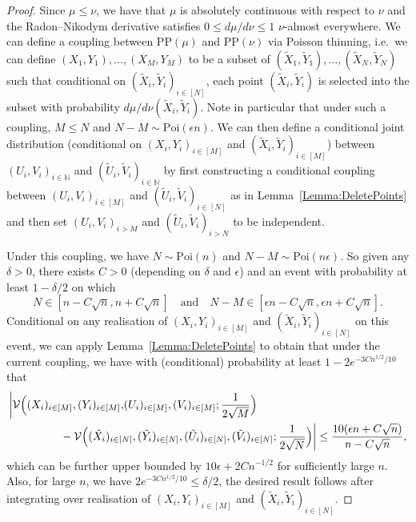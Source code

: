 \documentclass[11pt]{article}
\begin{document}
\begin{proof}
    Since $\mu\leq \nu$, we have that $\mu$ is absolutely continuous with respect to $\nu$ and the Radon--Nikodym derivative satisfies $0\leq d\mu/d\nu\leq 1$ $\nu$-almost everywhere. We can define a coupling between $\mathrm{PP}(\mu)$ and $\mathrm{PP}(\nu)$ via Poisson thinning, i.e.\ we can define $(X_1,Y_1),\ldots,(X_M,Y_M)$ to be a subset of $(\tilde X_1,\tilde Y_1),\ldots,(\tilde X_N,\tilde Y_N)$ such that conditional on $(\tilde X_i,\tilde Y_i)_{i\in[N]}$, each point $(\tilde X_i, \tilde Y_i)$ is selected into the subset with probability $d\mu/d\nu(\tilde X_i, \tilde Y_i)$. Note in particular that under such a coupling, $M\leq N$ and $N-M\sim \mathrm{Poi}(\epsilon n)$. 
    We can then define a conditional joint distribution (conditional on $(X_i,Y_i)_{i\in[M]}$ and $(\tilde X_i,\tilde Y_i)_{i\in[M]}$) between $(U_i,V_i)_{i\in\mathbb{N}}$ and $(\tilde U_i,\tilde V_i)_{i\in\mathbb{N}}$ by first constructing a conditional coupling between $(U_i, V_i)_{i\in [M]}$ and $(\tilde U_i,\tilde V_i)_{i\in [N]}$ as in Lemma~\ref{Lemma:DeletePoints} and then set $(U_i,V_i)_{i > M}$ and $(\tilde U_i, \tilde V_i)_{i > N}$ to be independent.

    Under this coupling, we have $N\sim \mathrm{Poi}(n)$ and $N-M\sim\mathrm{Poi}(n\epsilon)$. So given any $\delta > 0$, there exists $C > 0$ (depending on $\delta$ and $\epsilon$) and an event with probability at least $1-\delta/2$ on which 
    \[
    N \in [n-C\sqrt{n}, n+C\sqrt{n}] \quad \text{and}\quad  N-M \in [\epsilon n-C\sqrt{n}, \epsilon n + C\sqrt{n}].
    \]
    Conditional on any realisation of $(X_i,Y_i)_{i\in[M]}$ and $(\tilde X_i,\tilde Y_i)_{i\in [N]}$ on this event, we can apply Lemma~\ref{Lemma:DeletePoints} to obtain that under the current coupling, we have with (conditional) probability at least $1-2e^{-3Cn^{1/2}/10}$ that 
    \begin{align*}
    \biggl|\mathcal{V}\Bigl((X_i)_{i\in[M]}, (Y_i)_{i\in[M]}, &(U_i)_{i\in[M]}, (V_i)_{i\in[M]}; \frac{1}{2\sqrt{M}}\Bigr) \\
    & \hspace{-2cm}- \mathcal{V}\Bigl((\tilde X_i)_{i\in[N]}, (\tilde Y_i)_{i\in[N]}, (\tilde U_i)_{i\in[N]}, (\tilde V_i)_{i\in[N]}; \frac{1}{2\sqrt{N}}\Bigr)\biggr| \leq \frac{10(\epsilon n + C\sqrt{n})}{n-C\sqrt{n}},
\end{align*}
which can be further upper bounded by $10\epsilon + 2C n^{-1/2}$ for sufficiently large $n$. Also, for large $n$, we have $2e^{-3Cn^{1/2}/10}\leq \delta/2$, the desired result follows after integrating over realisation of $(X_i,Y_i)_{i\in[M]}$ and $(\tilde X_i,\tilde Y_i)_{i\in [N]}$.
\end{proof}
\end{document}
